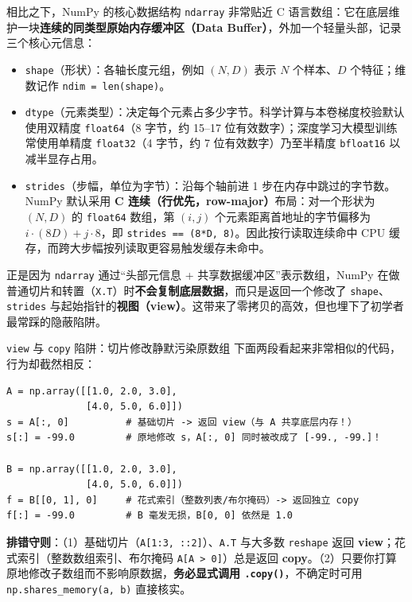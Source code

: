 相比之下，NumPy 的核心数据结构 \texttt{ndarray} 非常贴近 C 语言数组：它在底层维护一块\textbf{连续的同类型原始内存缓冲区（Data Buffer）}，外加一个轻量头部，记录三个核心元信息：
\begin{itemize}
  \item \texttt{shape}（形状）：各轴长度元组，例如 $(N, D)$ 表示 $N$ 个样本、$D$ 个特征；维数记作 \texttt{ndim = len(shape)}。
  \item \texttt{dtype}（元素类型）：决定每个元素占多少字节。科学计算与本卷梯度校验默认使用双精度 \texttt{float64}（8 字节，约 15--17 位有效数字）；深度学习大模型训练常使用单精度 \texttt{float32}（4 字节，约 7 位有效数字）乃至半精度 \texttt{bfloat16} 以减半显存占用。
  \item \texttt{strides}（步幅，单位为字节）：沿每个轴前进 1 步在内存中跳过的字节数。NumPy 默认采用 \textbf{C 连续（行优先，row-major）}布局：对一个形状为 $(N, D)$ 的 \texttt{float64} 数组，第 $(i, j)$ 个元素距离首地址的字节偏移为 $i \cdot (8D) + j \cdot 8$，即 \texttt{strides == (8*D, 8)}。因此按行读取连续命中 CPU 缓存，而跨大步幅按列读取更容易触发缓存未命中。
\end{itemize}

正是因为 \texttt{ndarray} 通过“头部元信息 + 共享数据缓冲区”表示数组，NumPy 在做普通切片和转置（\texttt{X.T}）时\textbf{不会复制底层数据}，而只是返回一个修改了 \texttt{shape}、\texttt{strides} 与起始指针的\textbf{视图（view）}。这带来了零拷贝的高效，但也埋下了初学者最常踩的隐蔽陷阱。

\begin{failBox}{\texttt{view} 与 \texttt{copy} 陷阱：切片修改静默污染原数组}
下面两段看起来非常相似的代码，行为却截然相反：
\begin{lstlisting}[numbers=none]
A = np.array([[1.0, 2.0, 3.0],
              [4.0, 5.0, 6.0]])
s = A[:, 0]          # 基础切片 -> 返回 view（与 A 共享底层内存！）
s[:] = -99.0         # 原地修改 s，A[:, 0] 同时被改成了 [-99., -99.]！

B = np.array([[1.0, 2.0, 3.0],
              [4.0, 5.0, 6.0]])
f = B[[0, 1], 0]     # 花式索引（整数列表/布尔掩码）-> 返回独立 copy
f[:] = -99.0         # B 毫发无损，B[0, 0] 依然是 1.0
\end{lstlisting}
\textbf{排错守则}：（1）基础切片（\texttt{A[1:3, ::2]}）、\texttt{A.T} 与大多数 \texttt{reshape} 返回 \textbf{view}；花式索引（整数数组索引、布尔掩码 \texttt{A[A > 0]}）总是返回 \textbf{copy}。（2）只要你打算原地修改子数组而不影响原数据，\textbf{务必显式调用 \texttt{.copy()}}，不确定时可用 \texttt{np.shares\_memory(a, b)} 直接核实。
\end{failBox}

